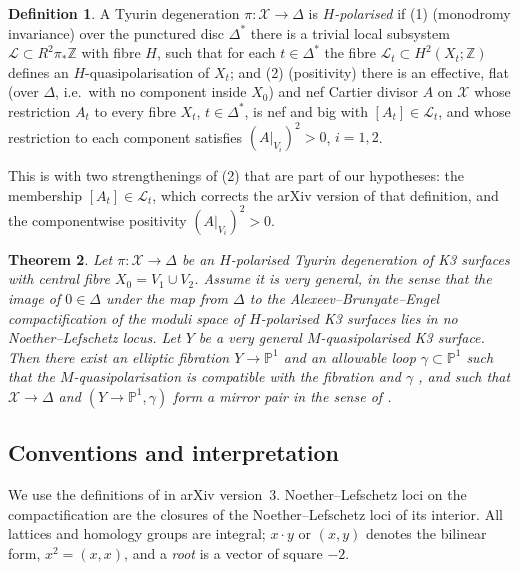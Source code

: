 \documentclass[11pt]{article}
\newcommand{\Z}{\mathbb Z}
\newcommand{\PP}{\mathbb P}
\newcommand{\calX}{\mathcal X}
\newcommand{\calL}{\mathcal L}
\newtheorem{theorem}{Theorem}[section]
\theoremstyle{definition}
\newtheorem{definition}[theorem]{Definition}
\theoremstyle{remark}
\begin{document}
\begin{definition}\label{def:Hpol}
A Tyurin degeneration \(\pi\colon\calX\to\Delta\) is
\emph{\(H\)-polarised} if
(1) (monodromy invariance) over the punctured disc \(\Delta^*\)
there is a trivial local subsystem \(\calL\subset R^2\pi_*\Z\) with
fibre \(H\), such that for each \(t\in\Delta^*\) the fibre
\(\calL_t\subset H^2(X_t;\Z)\) defines an \(H\)-quasipolarisation of
\(X_t\); and
(2) (positivity) there is an effective, flat (over \(\Delta\), i.e.\
with no component inside \(X_0\)) and nef Cartier divisor
\(A\) on \(\calX\) whose restriction \(A_t\) to every fibre \(X_t\),
\(t\in\Delta^*\), is nef and big with \([A_t]\in\calL_t\), and whose
restriction to each component satisfies \((A|_{V_i})^2>0\),
\(i=1,2\).
\end{definition}

This is \cite[Definition~3.20]{GT} with two strengthenings of (2)
that are part of our hypotheses: the membership \([A_t]\in\calL_t\),
which corrects the arXiv version of that definition, and the
componentwise positivity \((A|_{V_i})^2>0\).

\begin{theorem}\label{thm:main}
Let \(\pi\colon\calX\to\Delta\) be an \(H\)-polarised Tyurin
degeneration of K3 surfaces with central fibre \(X_0=V_1\cup V_2\).
Assume it is very general, in the sense that the image of
\(0\in\Delta\) under the map from \(\Delta\) to the
Alexeev--Brunyate--Engel compactification \cite{ABE} of the moduli
space of \(H\)-polarised K3 surfaces lies in no Noether--Lefschetz
locus. Let \(Y\) be a very general \(M\)-quasipolarised K3 surface.
Then there exist an elliptic fibration \(Y\to\PP^1\) and an allowable
loop \(\gamma\subset\PP^1\) \cite[Definition~4.11]{GT} such that the
\(M\)-quasipolarisation is compatible with the fibration and
\(\gamma\) \cite[Definition~4.21]{GT}, and such that \(\calX\to\Delta\)
and \((Y\to\PP^1,\gamma)\) form a mirror pair in the sense of
\cite[Definition~5.1]{GT}.
\end{theorem}

\subsection{Conventions and interpretation}\label{sec:conventions}

We use the definitions of \cite{GT} in arXiv version~3.
Noether--Lefschetz loci on the compactification are the closures of
the Noether--Lefschetz loci of its interior. All lattices and homology
groups are integral; \(x\cdot y\) or \((x,y)\) denotes the bilinear
form, \(x^2=(x,x)\), and a \emph{root} is a vector of square \(-2\).
\end{document}
